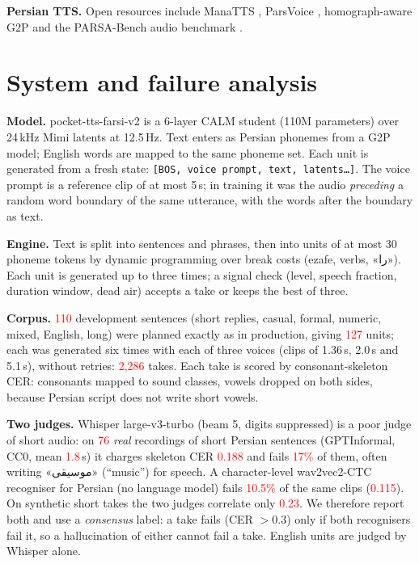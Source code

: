 \documentclass[conference]{IEEEtran}
\newcommand{\fa}[1]{{\persianfont\beginR #1\endR}}
\newcommand{\RES}[1]{\textcolor{red}{#1}}
\begin{document}
\textbf{Persian TTS.} Open resources include ManaTTS \cite{manatts2025}, ParsVoice \cite{parsvoice2026},
homograph-aware G2P \cite{homorich2025} and the PARSA-Bench audio benchmark \cite{parsabench2026}.

\section{System and failure analysis}\label{sec:system}
\textbf{Model.} pocket-tts-farsi-v2 \cite{farsiv2} is a 6-layer CALM student (110M parameters) over 24\,kHz
Mimi \cite{moshi2024} latents at 12.5\,Hz. Text enters as Persian phonemes from a G2P model; English words are mapped to the
same phoneme set. Each unit is generated from a fresh state: \texttt{[BOS, voice prompt, text, latents\dots]}.
The voice prompt is a reference clip of at most 5\,s; in training it was the audio \emph{preceding} a random
word boundary of the same utterance, with the words after the boundary as text.

\textbf{Engine.} Text is split into sentences and phrases, then into units of at most 30 phoneme tokens by
dynamic programming over break costs (ezafe, verbs, \fa{«را»}). Each unit is generated up to three times; a
signal check (level, speech fraction, duration window, dead air) accepts a take or keeps the best of three.

\textbf{Corpus.} \RES{110} development sentences (short replies, casual, formal, numeric, mixed, English, long)
were planned exactly as in production, giving \RES{127} units; each was generated six times with each of three voices
(clips of 1.36\,s, 2.0\,s and 5.1\,s), without retries: \RES{2{,}286} takes. Each take is scored by
consonant-skeleton CER: consonants mapped to sound classes, vowels dropped on both sides, because Persian
script does not write short vowels.

\textbf{Two judges.} Whisper large-v3-turbo \cite{whisper2023} (beam 5, digits suppressed) is a poor judge of
short audio: on \RES{76} \emph{real} recordings of short Persian sentences (GPTInformal, CC0, mean
\RES{1.8}\,s) it charges skeleton CER \RES{0.188} and fails \RES{17\%} of them, often writing \fa{«موسیقی»}
(``music'') for speech. A character-level wav2vec2-CTC recogniser for Persian (no language model) fails
\RES{10.5\%} of the same clips (\RES{0.115}). On synthetic short takes the two judges correlate only
\RES{0.23}. We therefore report both and use a \emph{consensus} label: a take fails (CER $>0.3$) only if both
recognisers fail it, so a hallucination of either cannot fail a take. English units are judged by Whisper
alone.
\end{document}
